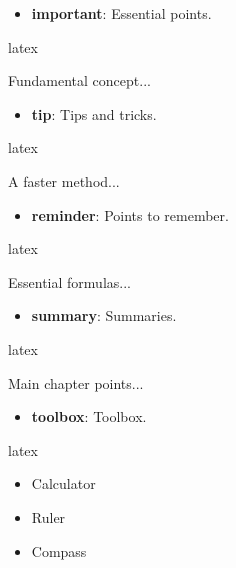 \documentclass[
    margin=2cm
]{neoschool}
\begin{document}
\begin{itemize}
\item
  \textbf{important}: Essential points.
\end{itemize}

\begin{code}{latex}
\begin{important}
    Fundamental concept...
\end{important}
\end{code}

\begin{itemize}
\item
  \textbf{tip}: Tips and tricks.
\end{itemize}

\begin{code}{latex}
\begin{tip}
    A faster method...
\end{tip}
\end{code}

\begin{itemize}
\item
  \textbf{reminder}: Points to remember.
\end{itemize}

\begin{code}{latex}
\begin{reminder}[Memorize]
    Essential formulas...
\end{reminder}
\end{code}

\begin{itemize}
\item
  \textbf{summary}: Summaries.
\end{itemize}

\begin{code}{latex}
\begin{summary}[In Brief]
    Main chapter points...
\end{summary}
\end{code}

\begin{itemize}
\item
  \textbf{toolbox}: Toolbox.
\end{itemize}

\begin{code}{latex}
\begin{toolbox}
  \begin{itemize}
    \item Calculator
    \item Ruler
    \item Compass
  \end{itemize}
\end{toolbox}
\end{code}
\end{document}
